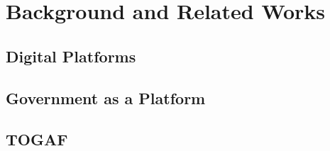 \setcounter{reaction}{0}%


\chapter{Background and Related Works} \label{chapter2}

\section{Digital Platforms}

\section{Government as a Platform}

\section{TOGAF}

